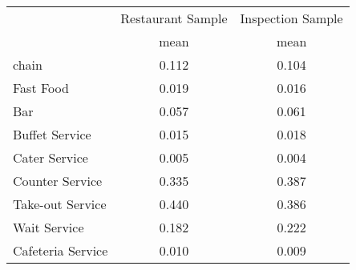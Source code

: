 {
\def\sym#1{\ifmmode^{#1}\else\(^{#1}\)\fi}
\begin{tabular}{l*{2}{c}}
\hline\hline
                    &\multicolumn{1}{c}{Restaurant Sample}&\multicolumn{1}{c}{Inspection Sample}\\
                    &        mean&        mean\\
\hline
chain               &       0.112&       0.104\\
Fast Food           &       0.019&       0.016\\
Bar                 &       0.057&       0.061\\
Buffet Service      &       0.015&       0.018\\
Cater Service       &       0.005&       0.004\\
Counter Service     &       0.335&       0.387\\
Take-out Service    &       0.440&       0.386\\
Wait Service        &       0.182&       0.222\\
Cafeteria Service   &       0.010&       0.009\\
\hline\hline
\end{tabular}
}
